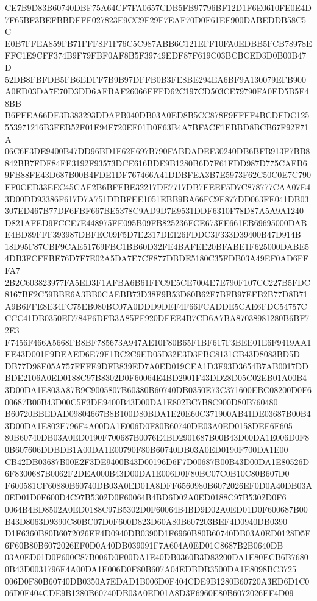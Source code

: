 \documentclass[UTF8,fontset=fandol,zihao=-4,a4paper]{ctexart}
\begin{document}
{{CE7B9D83B60740DBF75A64CF7FA0657CDB5FB97796BF12D1F6E0610FE0E4D7F65BF3BEFBBDFFF027823E9CC9F29F7EAF70D0F61EF900DABEDDB58C5C
E0B7FFEA859FB71FFF8F1F76C5C987ABB6C121EFF10FA0EDBB5FCB78978EFFC1E9CFF374B9F79FBF0AF8B5F39749EDF87F619C03BCBCED3D0B00B47D
52DB8FBFDB5FB6EDFF7B9B97DFFB0B3FE8BE294EA6BF9A130079EFB900A0ED03DA7E70D3DD6AFBAF26066FFFD62C197CD503CE79790FA0ED5B5F48BB
B6FFEA66DF3D383293DDAFB040DB03A0ED8B5CC878F9FFFF4BCDFDC125553971216B3FEB52F01E94F720EF01D0F63B4A7BFACF1EBBD8BCB67F92F71A
06C6F3DE9400B47DD96BD1F62F697B790FABDADEF30240DB6BFB913F7BB8842BB7FDF84FE3192F93573DCE616BDE9B1280B6D7F61FDD987D775CAFB6
9FB88FE43D687B00B4FDE1DF767466A41DDBFEA3B7E5973F62C50C0E7C790FF0CED33EEC45CAF2B6BFFBE32217DE7717DB7EEEF5D7C878777CAA07E4
3D00DD93386F617D7A751DDBFEE1051EBB9BA66FC9F877DD063FE041DB03307ED467B77DF6FBF667BE5378C9AD9D7E9531DDF6310F78D87A5A9A1240
D821AFED9FCCE7E448975FE095B09FB825236FCE673FE661EB69695000DABE4BD89FFF393987DBFEC09F5D7E2317DE126FDDC3F333D39400B47D914B
18D95F87CBF9CAE51769FBC1BB60D32FE4BAFEE20BFABE1F625000DABE54DB3FCFFBE76D7F7E02A5DA7E7CF877DBDE5180C35FDB03A49EF0AD6FFFA7
2B2C603823977FA5ED3F1AFBA6B61FFC9E5CE7004E7E790F107CC227B5FDC8167BF2C59BBE6A3BB0CAEBB73D38F9B53D80B62F7BFB97EFB2B77D8B71
A9B6FFE8E34FC75EB080BC07A0DDD9DEF4F66FCADDE5CAE6FDC54757CCCC41DB0350ED784F6DFB3A85FF920DFEE4B7CD6A7BA87038981280B6BF72E3
F7456F466A5668FB8BF785673A947AE10F80B65F1BF617F3BEE01E6F9419AA1EE43D001F9DEAED6E79F1BC2C9ED05D32E3D3FBC8131CB43D8083BD5D
DB77D98F05A757FFFE9DFB839ED7A0ED019CEA1D3F93D3654B7AB0017DDBDE2106A0ED0188C97B8302D0F60064E4BD2901F43DD28D05C02EB01A00B4
3D00DA1E803A87B9C9005807B60380B60740DB0350E73C371600EBC08200D0F600687B00B43D00C5F3DE9400B43D00DA1E802BC7B8C900D80B760480
B60720BBEDAD09804667B8B100D80BDA1E20E60C371900AB41DE03687B00B43D00DA1E802E796F4A00DA1E006D0F80B60740DE03A0ED0158DEF6F605
80B60740DB03A0ED0190F700687B0076E4BD2901687B00B43D00DA1E006D0F80B607606DDBDB1A00DA1E00790F80B60740DB03A0ED0190F700DA1E00
CB42DB03687B00E2F3DE9400B43D00196D6F7D00687B00B43D00DA1E80526D6F8300687B0062F2DEA000B43D00DA1E006D0F80BC07C0B10C80B607D0
F600581CF60880B60740DB03A0ED01A8DFF6560980B6072026EF0D0A40DB03A0ED01D0F600D4C97B5302D0F60064B4BD6D02A0ED0188C97B5302D0F6
0064B4BD8502A0ED0188C97B5302D0F60064B4BD9D02A0ED01D0F600687B00B43D8063D9390C80BC07D0F600D823D60A80B607203BEF4D0940DB0390
D1F6360B80B6072026EF4D0940DB0390D1F6960B80B60740DB03A0ED0128D5F6F60B80B6072026EF0D0A40DB039091F7A604A0ED01C8687B2B0640DB
03A0ED01D0F600C87B006D0F00DA1E40DB0360B3D83200DA1E80ECB6B76800B43D0031796F4A00DA1E006D0F80B607A04EDBDB3500DA1E8098BC3725
006D0F80B60740DB0350A7EDAD1B006D0F404CDE9B1280B60720A3ED6D1C006D0F404CDE9B1280B60740DB03A0ED01A8D3F6960E80B6072026EF4D09
}}
\end{document}
